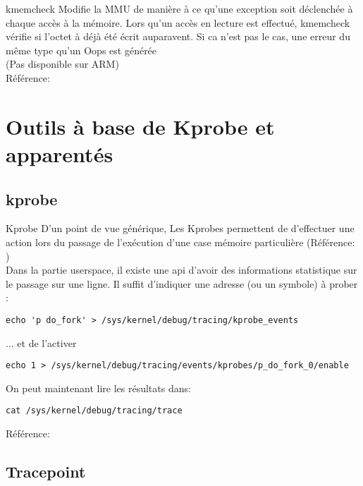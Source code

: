 \begin{frame}[fragile=singleslide]{kmemcheck}
  Modifie la  MMU de manière à  ce qu'une exception  soit déclenchée à
  chaque accès à la mémoire. Lors qu'un accès en lecture est effectué,
  kmemcheck  vérifie si  l'octet à  déjà été  écrit auparavent.  Si ca
  n'est pas le cas, une erreur du même type qu'un Oops est générée
  \\[2ex]
  (Pas disponible sur ARM)
  \\[2ex]
  Référence: 
\end{frame} 

\section{Outils à base de Kprobe et apparentés}

\subsection{kprobe}

\begin{frame}[fragile=singleslide]{Kprobe}
  D'un point  de vue générique, Les Kprobes  permettent de d'effectuer
  une  action  lors  du  passage  de l'exécution  d'une  case  mémoire
  particulière (Référence: )
  \\[2ex]
  Dans la partie userspace, il  existe une api d'avoir des informations
  statistique sur le passage sur  une ligne.  Il suffit d'indiquer une
  adresse (ou un symbole) à prober :
  \begin{lstlisting} 
echo 'p do_fork' > /sys/kernel/debug/tracing/kprobe_events 
  \end{lstlisting} 
  ... et de l'activer
  \begin{lstlisting} 
echo 1 > /sys/kernel/debug/tracing/events/kprobes/p_do_fork_0/enable             
  \end{lstlisting} 
  On peut maintenant lire les résultats dans:
  \begin{lstlisting} 
cat /sys/kernel/debug/tracing/trace
  \end{lstlisting} 
  Référence: 
\end{frame} 

\subsection{Tracepoint}

